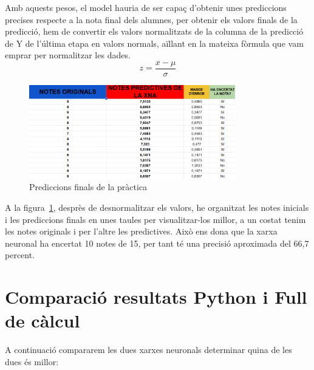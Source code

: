 Amb aquests pesos, el model hauria de ser capaç d'obtenir unes prediccions precises respecte a la nota final dels alumnes, per obtenir els valors finals de la predicció, hem de convertir els valors normalitzats de la columna de la predicció de Y de l'última etapa en valors normals, aïllant en la mateixa fòrmula que vam emprar per normalitzar les dades.
$$z = \frac{x - \mu}{\sigma}$$

\begin{figure}[h]
    \centering
    \includegraphics[width=0.8\textwidth]{./figures/Resultat_final.png}
    \caption{Prediccions finals de la pràctica}
    \label{f:resulat_full}
\end{figure}

A la figura~\ref{f:resulat_full}, desprès de desnormalitzar els valors, he organitzat les notes inicials i les prediccions finals en unes taules per visualitzar-los millor, a un costat tenim les notes originals i per l'altre les predictives.
Això ens dona que la xarxa neuronal ha encertat 10 notes de 15, per tant té una precisió aproximada del 66,7 percent.

\section{Comparació resultats Python i Full de càlcul}

A continuació compararem les dues xarxes neuronals determinar quina de les dues és millor:

